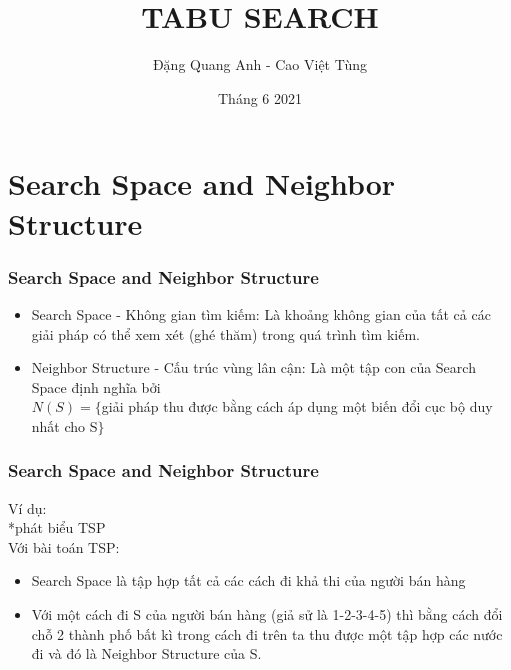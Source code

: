 \documentclass[12pt]{beamer}
\begin{document}
	\author{Đặng Quang Anh - Cao Việt Tùng}
	\title{TABU SEARCH}
	\date{Tháng 6 2021}
	\maketitle
	

	\section{Search Space and Neighbor Structure}
	\begin{frame}
		\frametitle{Search Space and Neighbor Structure}
		\begin{itemize}
			\item Search Space - Không gian tìm kiếm: Là khoảng không gian của tất cả các giải pháp có thể xem xét (ghé thăm) trong quá trình tìm kiếm.
			\item Neighbor Structure - Cấu trúc vùng lân cận: Là một tập con của Search Space định nghĩa bởi\\
					$N(S) = \{ $giải pháp thu được bằng cách áp dụng một biến đổi cục bộ duy nhất cho S$ \}$
		\end{itemize}
	\end{frame}

	\begin{frame}
		\frametitle{Search Space and Neighbor Structure}
		Ví dụ:\\
		*phát biểu TSP\\
		Với bài toán TSP:\\
		\begin{itemize}
			\item Search Space là tập hợp tất cả các cách đi khả thi của người bán hàng
			\item Với một cách đi S của người bán hàng (giả sử là 1-2-3-4-5) thì bằng cách đổi chỗ 2 thành phố bất kì trong cách đi trên ta thu được một tập hợp các nước đi và đó là Neighbor Structure của S.
		\end{itemize}
	\end{frame}
	
\end{document}
